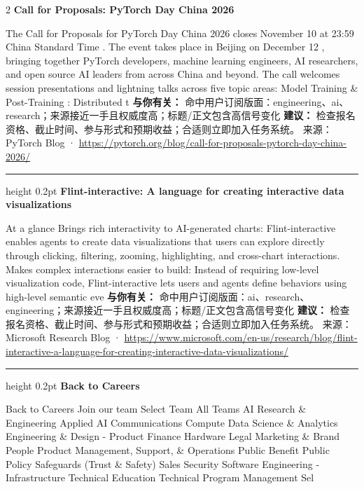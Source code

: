 \documentclass[10.5pt]{ctexart}
\begin{document}
\begin{multicols}{2}
{\large\bfseries Call for Proposals: PyTorch Day China 2026}\par
The Call for Proposals for PyTorch Day China 2026 closes November 10 at 23:59 China Standard Time . The event takes place in Beijing on December 12 , bringing together PyTorch developers, machine learning engineers, AI researchers, and open source AI leaders from across China and beyond. The call welcomes session presentations and lightning talks across five topic areas: Model Training \& Post-Training : Distributed t
\textbf{与你有关：} 命中用户订阅版面：engineering、ai、research；来源接近一手且权威度高；标题/正文包含高信号变化
\textbf{建议：} 检查报名资格、截止时间、参与形式和预期收益；合适则立即加入任务系统。
{\footnotesize\color{ormuted} 来源：PyTorch Blog · \url{https://pytorch.org/blog/call-for-proposals-pytorch-day-china-2026/}}
\vspace{2mm}
\hrule height 0.2pt
\vspace{2mm}
{\large\bfseries Flint-interactive: A language for creating interactive data visualizations}\par
At a glance Brings rich interactivity to AI-generated charts: Flint-interactive enables agents to create data visualizations that users can explore directly through clicking, filtering, zooming, highlighting, and cross-chart interactions. Makes complex interactions easier to build: Instead of requiring low-level visualization code, Flint-interactive lets users and agents define behaviors using high-level semantic eve
\textbf{与你有关：} 命中用户订阅版面：ai、research、engineering；来源接近一手且权威度高；标题/正文包含高信号变化
\textbf{建议：} 检查报名资格、截止时间、参与形式和预期收益；合适则立即加入任务系统。
{\footnotesize\color{ormuted} 来源：Microsoft Research Blog · \url{https://www.microsoft.com/en-us/research/blog/flint-interactive-a-language-for-creating-interactive-data-visualizations/}}
\vspace{2mm}
\hrule height 0.2pt
\vspace{2mm}
{\large\bfseries Back to Careers}\par
Back to Careers Join our team Select Team All Teams AI Research \& Engineering Applied AI Communications Compute Data Science \& Analytics Engineering \& Design - Product Finance Hardware Legal Marketing \& Brand People Product Management, Support, \& Operations Public Benefit Public Policy Safeguards (Trust \& Safety) Sales Security Software Engineering - Infrastructure Technical Education Technical Program Management Sel

\end{multicols}
\end{document}
